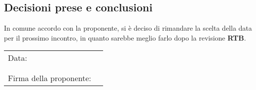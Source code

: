 \documentclass[italian,12pt]{article}
\begin{document}
\subsection{Decisioni prese e conclusioni}
In comune accordo con la proponente, si è deciso di rimandare la scelta della data per il prossimo incontro, in quanto
sarebbe meglio farlo dopo la revisione \textbf{RTB}.\\


\newpage
\begin{table}[b]
	\begin{tabular}{@{}p{5cm}p{10cm}@{}}
		Data:  & \hrulefill \\
		       &            \\
		       &            \\
		Firma della proponente: & \hrulefill \\
	\end{tabular}
\end{table}
\end{document}
